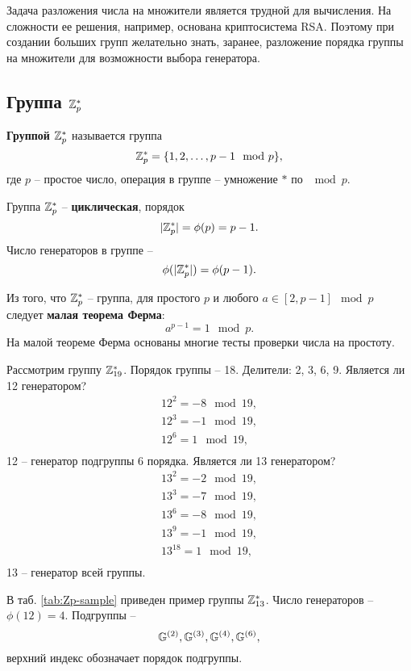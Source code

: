 Задача разложения числа на множители является трудной для вычисления. На сложности ее решения, например, основана криптосистема RSA. Поэтому при создании больших групп желательно знать, заранее, разложение порядка группы на множители для возможности выбора генератора.


\subsection{Группа $\mathbb{Z}_p^*$}

\textbf{Группой $\mathbb{Z}_p^*$} называется группа
    \[ \mathbb{Z}_p^* = \{1, 2,  \dots,  p-1 \mod p\}, \]
где $p$ -- простое число, операция в группе -- умножение $\ast$ по $\mod p$.

Группа $\mathbb{Z}_p^*$ -- \textbf{циклическая}, порядок
    \[ |\mathbb{Z}_p^*| = \phi(p) = p - 1. \]
Число генераторов в группе --
    \[ \phi(|\mathbb{Z}_p^*|) = \phi(p-1). \]

Из того, что $\mathbb{Z}_p^*$ -- группа, для простого $p$ и любого $a \in [2, p-1] \mod p$ следует \textbf{малая теорема Ферма}:
    \[ a^{p-1} = 1 \mod p. \]
На малой теореме Ферма основаны многие тесты проверки числа на простоту.

\example
Рассмотрим группу $\mathbb{Z}_{19}^*$. Порядок группы -- 18. Делители: 2, 3, 6, 9. Является ли 12 генератором?
\[ \begin{array}{l}
    12^2 = -8 \mod 19, \\
    12^3 = -1 \mod 19, \\
    12^6 = 1 \mod 19, \\
\end{array} \]
12 -- генератор подгруппы 6 порядка. Является ли 13 генератором?
\[ \begin{array}{l}
    13^2 = -2 \mod 19, \\
    13^3 = -7 \mod 19, \\
    13^6 = -8 \mod 19, \\
    13^9 = -1 \mod 19, \\
    13^{18} = 1 \mod 19, \\
\end{array} \]
13 -- генератор всей группы.
\exampleend

\example
В таб. \ref{tab:Zp-sample} приведен пример группы $\mathbb{Z}_{13}^*$.  Число генераторов -- $\phi(12) = 4$. Подгруппы --
    \[ \mathbb{G}^{(2)}, \mathbb{G}^{(3)}, \mathbb{G}^{(4)}, \mathbb{G}^{(6)}, \]
верхний индекс обозначает порядок подгруппы.

